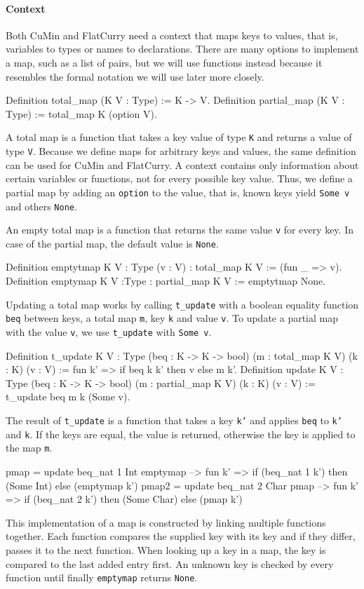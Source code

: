 \documentclass[paper = a4, fleqn, abstract=on, twoside]{scrreprt}
\begin{document}
\paragraph{Context}
Both CuMin and FlatCurry need a context that maps keys to values, that is, variables to types or names to declarations. There are many options to implement a map, such as a list of pairs, but we will use functions instead because it resembles the formal notation we will use later more closely.
\begin{coqcode}
Definition total_map   (K V : Type) := K -> V.
Definition partial_map (K V : Type) := total_map K (option V).
\end{coqcode}
A total map is a function that takes a key value of type \texttt{K} and returns a value of type \texttt{V}. Because we define maps for arbitrary keys and values, the same definition can be used for CuMin and FlatCurry. A context contains only information about certain variables or functions, not for every possible key value. Thus, we define a partial map by adding an \texttt{option} to the value, that is, known keys yield \texttt{Some v} and others \texttt{None}.\\
\par \noindent
An empty total map is a function that returns the same value \texttt{v}  for every key. In case of the partial map, the default value is \texttt{None}.
\begin{coqcode}
Definition emptytmap {K V : Type} (v : V) : total_map K V := (fun _ => v).
Definition emptymap {K V :Type} : partial_map K V := emptytmap None.
\end{coqcode}
Updating a total map works by calling \texttt{t\_update} with a boolean equality function \texttt{beq} between keys, a total map \texttt{m}, key \texttt{k} and value \texttt{v}. To update a partial map with the value \texttt{v}, we use \texttt{t\_update} with \texttt{Some v}.
\begin{coqcode}
Definition t_update {K V : Type} (beq : K -> K -> bool) (m : total_map K V)
(k : K) (v : V) := fun k' => if beq k k' then v else m k'.
Definition update {K V : Type} (beq : K -> K -> bool) (m : partial_map K V)
(k : K) (v : V) := t_update beq m k (Some v).
\end{coqcode}
The result of \texttt{t\_update} is a function that takes a key \texttt{k'} and applies \texttt{beq} to \texttt{k'} and \texttt{k}. If the keys are equal, the value is returned, otherwise the key is applied to the map \texttt{m}. 
\begin{coqcode}
pmap = update beq_nat 1 Int emptymap
--> fun k' => if (beq_nat 1 k') then (Some Int) else (emptymap k')
pmap2 = update beq_nat 2 Char pmap
--> fun k' => if (beq_nat 2 k') then (Some Char) else (pmap k')   
\end{coqcode}
This implementation of a map is constructed by linking multiple functions together. Each function compares the supplied key with its key and if they differ, passes it to the next function. When looking up a key in a map, the key is compared to the last added entry first. An unknown key is checked by every function until finally \texttt{emptymap} returns \texttt{None}.
\end{document}
